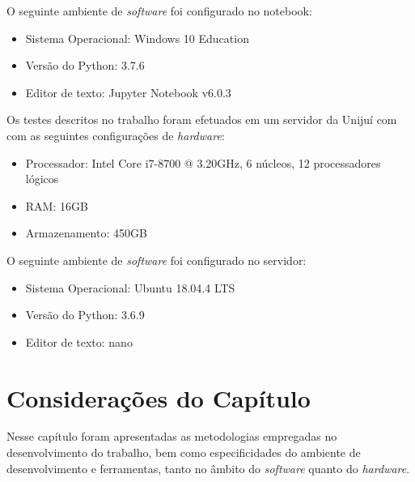 O seguinte ambiente de \textit{software} foi configurado no notebook:
\begin{itemize}
    \item Sistema Operacional: Windows 10 Education
    \item Versão do Python: 3.7.6
    \item Editor de texto: Jupyter Notebook v6.0.3
\end{itemize}

Os testes descritos no trabalho foram efetuados em um servidor da Unijuí com  com as seguintes configurações de \textit{hardware}:
\begin{itemize}
    \item Processador: Intel Core i7-8700 @ 3.20GHz, 6 núcleos, 12 processadores lógicos
    \item RAM: 16GB
    \item Armazenamento: 450GB
\end{itemize}

O seguinte ambiente de \textit{software} foi configurado no servidor:
\begin{itemize}
    \item Sistema Operacional: Ubuntu 18.04.4 LTS
    \item Versão do Python: 3.6.9
    \item Editor de texto: nano
\end{itemize}

\section{Considerações do Capítulo} \label{consid2}
Nesse capítulo foram apresentadas as metodologias empregadas no desenvolvimento do trabalho, bem como especificidades do ambiente de desenvolvimento e ferramentas, tanto no âmbito do \textit{software} quanto do \textit{hardware}. 
